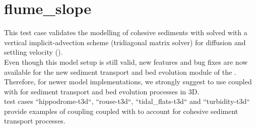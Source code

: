 \chapter{flume\_slope}

This test case validates the modelling of cohesive sediments with 
solved with a vertical implicit-advection scheme (tridiagonal matrix solver)
for diffusion and settling velocity
().\\

Even though this model setup is still valid, new features and bug fixes are now
available for the new sediment transport and bed evolution module \gaia of the
\telemacsystem.
Therefore, for newer model implementations, we strongly suggest to use
 coupled with \gaia for sediment transport and bed evolution
processes in 3D.\\

\gaia test cases “hippodrome-t3d“, “rouse-t3d“, “tidal\_flats-t3d“ and
“turbidity-t3d“ provide examples of coupling  coupled with
\gaia to account for cohesive sediment transport processes.
